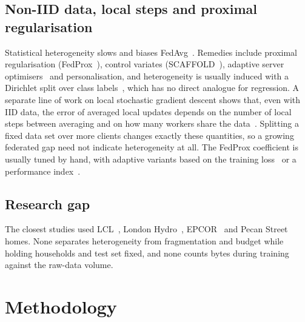 \subsection{Non-IID data, local steps and proximal regularisation}
Statistical heterogeneity slows and biases FedAvg~\cite{zhao2018noniid,kairouz2021advances}. Remedies include proximal
regularisation (FedProx~\cite{li2020fedprox}), control variates (SCAFFOLD~\cite{karimireddy2020scaffold}), adaptive
server optimisers~\cite{reddi2021fedopt} and personalisation, and heterogeneity is usually induced with a Dirichlet
split over class labels~\cite{hsu2019dirichlet}, which has no direct analogue for regression. A separate line of work
on local stochastic gradient descent shows that, even with IID data, the error of averaged local updates depends on the
number of local steps between averaging and on how many workers share the
data~\cite{stich2019localsgd,woodworth2020localsgd,woodworth2020minibatch}. Splitting a fixed data set over more
clients changes exactly these quantities, so a growing federated gap need not indicate heterogeneity at all. The
FedProx coefficient is usually tuned by hand, with adaptive variants based on the training loss~\cite{li2020fedprox} or a
performance index~\cite{mhou2025hapi}.

\subsection{Research gap}
The closest studies used LCL~\cite{briggs2022}, London Hydro~\cite{fekri2022}, EPCOR~\cite{gholizadeh2022} and Pecan
Street~\cite{taik2020} homes. None separates heterogeneity from fragmentation and budget while holding households and
test set fixed, and none counts bytes during training against the raw-data volume.


\section{Methodology}

